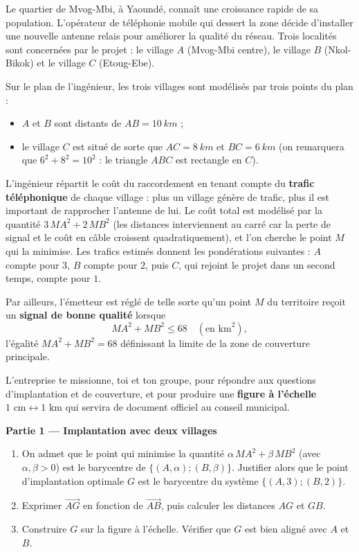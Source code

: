 \documentclass[11pt]{article}
\newcommand{\cle}[1]{{\popxbold\color{popdark}#1}}
\newcounter{popsec}
\newcounter{popsub}
\newcommand{\courssub}[1]{%
  \stepcounter{popsub}%
  \par\vspace{9pt}\noindent{\popxbold\fontsize{11.5}{13}\selectfont\color{popink}{\color{poporange}\thepopsec.\thepopsub}\hspace{6pt}#1}\par\nopagebreak\vspace{4pt}
}
\begin{document}
\courssub{Situation}

Le quartier de Mvog-Mbi, à Yaoundé, connaît une croissance rapide de sa population. L'opérateur de téléphonie mobile qui dessert la zone décide d'installer une nouvelle \cle{antenne relais} pour améliorer la qualité du réseau. Trois localités sont concernées par le projet : le village $A$ (Mvog-Mbi centre), le village $B$ (Nkol-Bikok) et le village $C$ (Etoug-Ebe).

Sur le plan de l'ingénieur, les trois villages sont modélisés par trois points du plan :
\begin{itemize}
\item $A$ et $B$ sont distants de $AB = \SI{10}{km}$ ;
\item le village $C$ est situé de sorte que $AC = \SI{8}{km}$ et $BC = \SI{6}{km}$ (on remarquera que $6^2 + 8^2 = 10^2$ : le triangle $ABC$ est rectangle en $C$).
\end{itemize}

L'ingénieur répartit le coût du raccordement en tenant compte du \textbf{trafic téléphonique} de chaque village : plus un village génère de trafic, plus il est important de rapprocher l'antenne de lui. Le coût total est modélisé par la quantité $3\,MA^2 + 2\,MB^2$ (les distances interviennent au carré car la perte de signal et le coût en câble croissent quadratiquement), et l'on cherche le point $M$ qui la minimise. Les trafics estimés donnent les pondérations suivantes : $A$ compte pour $3$, $B$ compte pour $2$, puis $C$, qui rejoint le projet dans un second temps, compte pour $1$.

Par ailleurs, l'émetteur est réglé de telle sorte qu'un point $M$ du territoire reçoit un \textbf{signal de bonne qualité} lorsque
\[ MA^2 + MB^2 \leq 68 \quad (\text{en } \mathrm{km}^2), \]
l'égalité $MA^2 + MB^2 = 68$ définissant la limite de la zone de couverture principale.

L'entreprise te missionne, toi et ton groupe, pour répondre aux questions d'implantation et de couverture, et pour produire une \textbf{figure à l'échelle $1 \text{ cm} \leftrightarrow 1 \text{ km}$} qui servira de document officiel au conseil municipal.

\courssub{Consignes}

\textbf{Partie 1 — Implantation avec deux villages}

\begin{enumerate}
\item On admet que le point qui minimise la quantité $\alpha\,MA^2 + \beta\,MB^2$ (avec $\alpha, \beta > 0$) est le barycentre de $\{(A,\alpha);(B,\beta)\}$. Justifier alors que le point d'implantation optimale $G$ est le barycentre du système $\{(A, 3) ; (B, 2)\}$.
\item Exprimer $\overrightarrow{AG}$ en fonction de $\overrightarrow{AB}$, puis calculer les distances $AG$ et $GB$.
\item Construire $G$ sur la figure à l'échelle. Vérifier que $G$ est bien aligné avec $A$ et $B$.
\end{enumerate}
\end{document}
